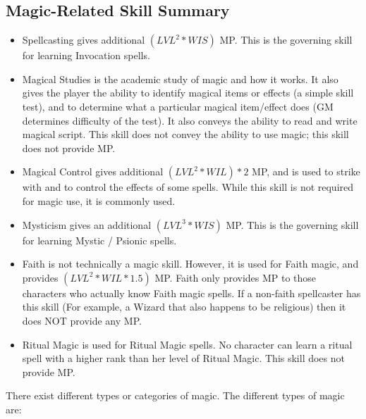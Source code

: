 \subsection{Magic-Related Skill Summary}

\begin{itemize}
\item Spellcasting gives additional $(LVL^2* WIS)$ MP.  This is the
  governing skill for learning Invocation spells.
\item Magical Studies is the academic study of magic and how it works.
  It also gives the player the ability to identify magical items or
  effects (a simple skill test), and to determine what a particular
  magical item/effect does (GM determines difficulty of the test). It
  also conveys the ability to read and write magical script.  This
  skill does not convey the ability to use magic; this skill does not
  provide MP.
\item Magical Control gives additional $(LVL^2*WIL)*2$ MP, and is used
  to strike with and to control the effects of some spells.  While
  this skill is not required for magic use, it is commonly used.
\item Mysticism gives an additional $(LVL^3 * WIS)$ MP.  This is the
  governing skill for learning Mystic / Psionic spells.
\item Faith is not technically a magic skill.  However, it is used for
  Faith magic, and provides $(LVL^2 * WIL *1.5)$ MP.  Faith only
  provides MP to those characters who actually know Faith magic
  spells.  If a non-faith spellcaster has this skill (For example, a
  Wizard that also happens to be religious) then it does NOT provide
  any MP.
\item Ritual Magic is used for Ritual Magic spells.  No character can
  learn a ritual spell with a higher rank than her level of Ritual
  Magic.  This skill does not provide MP.
\end{itemize}


There exist different types or categories of magic.  The different
types of magic are:

